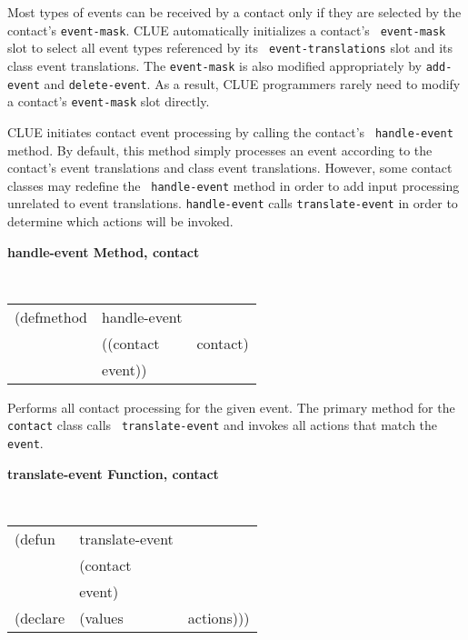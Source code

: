 \documentclass[twoside]{book}
\begin{document}
\begin{sloppy}
Most types of events can be received by a contact only if they are selected by
the contact's {\tt event-mask}. CLUE automatically initializes a contact's {\tt
event-mask} slot to select all event types referenced by its {\tt
event-translations} slot and its class event translations. The {\tt event-mask}
is also modified appropriately by {\tt add-event} and {\tt delete-event}.
As a result, CLUE programmers rarely need to modify a contact's {\tt event-mask}
slot directly.

CLUE initiates contact event processing by calling the contact's {\tt
handle-event} method. By default, this method simply processes an event
according to the contact's event translations and class event
translations. 
However, some
contact classes may redefine the {\tt
handle-event} method in order to add input processing unrelated to event
translations.
{\tt handle-event} calls {\tt translate-event} in order to determine
which actions will be invoked.


{\samepage
{\large {\bf handle-event \hfill Method, contact}}
\begin{flushright} \parbox[t]{6.125in}{
\tt
\begin{tabular}{lll}
\raggedright
(defmethod & handle-event & \\
& ((contact  &contact)\\ 
& event))
\end{tabular}
\rm

}\end{flushright}}

\begin{flushright} \parbox[t]{6.125in}{
Performs all contact processing for the given event. 
The primary method for the {\tt contact} class calls {\tt
translate-event} and invokes all actions that match the {\tt event}.

}\end{flushright}

{\samepage 
{\large {\bf translate-event \hfill Function, contact}}
\begin{flushright} \parbox[t]{6.125in}{
\tt
\begin{tabular}{lll}
\raggedright
(defun & translate-event & \\
& (contact\\
& event) \\
(declare &(values &actions)))
\end{tabular}
\rm

}
\end{flushright}}
\end{sloppy}
\end{document}
